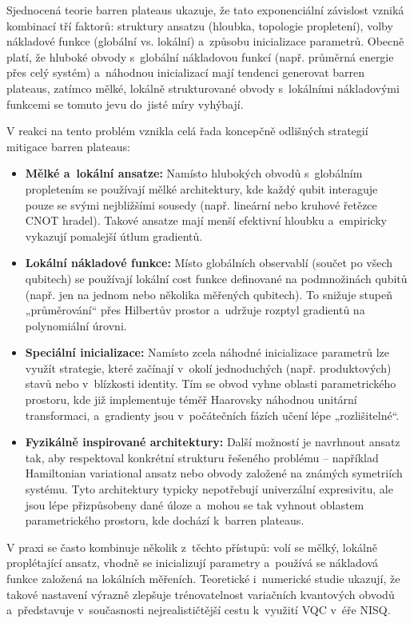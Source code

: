 \documentclass[12pt, a4paper]{report}
\begin{document}
Sjednocená teorie barren plateaus ukazuje, že tato exponenciální závislost vzniká kombinací tří faktorů: struktury ansatzu (hloubka, topologie propletení), volby nákladové funkce (globální vs. lokální) a~způsobu inicializace parametrů. Obecně platí, že hluboké obvody s~globální nákladovou funkcí (např. průměrná energie přes celý systém) a~náhodnou inicializací mají tendenci generovat barren plateaus, zatímco mělké, lokálně strukturované obvody s~lokálními nákladovými funkcemi se tomuto jevu do~jisté míry vyhýbají.

V reakci na tento problém vznikla celá řada koncepčně odlišných strategií mitigace barren plateaus:

\begin{itemize}
    \item \textbf{Mělké a~lokální ansatze:} Namísto hlubokých obvodů s~globálním propletením se používají mělké architektury, kde každý qubit interaguje pouze se svými nejbližšími sousedy (např. lineární nebo kruhové řetězce CNOT hradel). Takové ansatze mají menší efektivní hloubku a~empiricky vykazují pomalejší útlum gradientů.
    \item \textbf{Lokální nákladové funkce:} Místo globálních observablí (součet po všech qubitech) se používají lokální cost funkce definované na podmnožinách qubitů (např. jen na jednom nebo několika měřených qubitech). To snižuje stupeň „průměrování“ přes Hilbertův prostor a~udržuje rozptyl gradientů na polynomiální úrovni.
    \item \textbf{Speciální inicializace:} Namísto zcela náhodné inicializace parametrů lze využít strategie, které začínají v~okolí jednoduchých (např. produktových) stavů nebo v~blízkosti identity. Tím se obvod vyhne oblasti parametrického prostoru, kde již implementuje téměř Haarovsky náhodnou unitární transformaci, a~gradienty jsou v~počátečních fázích učení lépe „rozlišitelné“.
    \item \textbf{Fyzikálně inspirované architektury:} Další možností je navrhnout ansatz tak, aby respektoval konkrétní strukturu řešeného problému – například Hamiltonian variational ansatz nebo obvody založené na známých symetriích systému. Tyto architektury typicky nepotřebují univerzální expresivitu, ale jsou lépe přizpůsobeny dané úloze a~mohou se tak vyhnout oblastem parametrického prostoru, kde dochází k~barren plateaus.
\end{itemize}

V praxi se často kombinuje několik z~těchto přístupů: volí se mělký, lokálně proplétající ansatz, vhodně se inicializují parametry a~používá se nákladová funkce založená na lokálních měřeních. Teoretické i~numerické studie ukazují, že takové nastavení výrazně zlepšuje trénovatelnost variačních kvantových obvodů a~představuje v~současnosti nejrealističtější cestu k~využití VQC v~éře NISQ.
\end{document}
